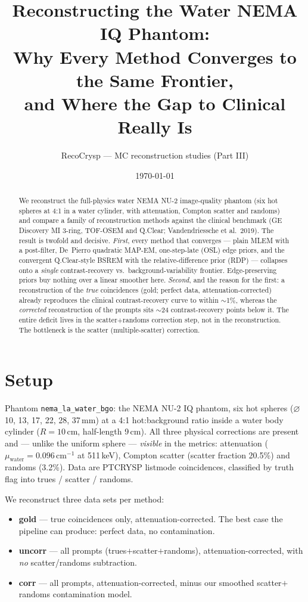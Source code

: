 \documentclass[11pt]{article}
\title{Reconstructing the Water NEMA IQ Phantom:\\
       Why Every Method Converges to the Same Frontier,\\
       and Where the Gap to Clinical Really Is}
\author{RecoCrysp --- MC reconstruction studies (Part III)}
\date{\today}
\newcommand{\code}[1]{\texttt{#1}}
\begin{document}
\maketitle

\begin{abstract}
We reconstruct the full-physics water NEMA NU-2 image-quality phantom (six hot
spheres at 4:1 in a water cylinder, with attenuation, Compton scatter and randoms)
and compare a family of reconstruction methods against the clinical benchmark
(GE Discovery MI 3-ring, TOF-OSEM and Q.Clear; Vandendriessche et al.\ 2019). The
result is twofold and decisive. \emph{First}, every method that converges --- plain
MLEM with a post-filter, De~Pierro quadratic MAP-EM, one-step-late (OSL) edge priors,
and the convergent Q.Clear-style BSREM with the relative-difference prior (RDP) ---
collapses onto a \emph{single} contrast-recovery vs.\ background-variability frontier.
Edge-preserving priors buy nothing over a linear smoother here. \emph{Second}, and the
reason for the first: a reconstruction of the \emph{true} coincidences (gold; perfect
data, attenuation-corrected) already reproduces the clinical contrast-recovery curve to
within $\sim$1\%, whereas the \emph{corrected} reconstruction of the prompts sits
$\sim$24 contrast-recovery points below it. The entire deficit lives in the
scatter$+$randoms correction step, not in the reconstruction. The bottleneck is the
scatter (multiple-scatter) correction.
\end{abstract}

\section{Setup}
Phantom \code{nema\_la\_water\_bgo}: the NEMA NU-2 IQ phantom, six hot spheres
($\varnothing$ 10, 13, 17, 22, 28, 37\,mm) at a 4:1 hot:background ratio inside a water
body cylinder ($R=10$\,cm, half-length 9\,cm). All three physical corrections are
present and --- unlike the uniform sphere --- \emph{visible} in the metrics:
attenuation ($\mu_{\text{water}}=0.096\,\text{cm}^{-1}$ at 511\,keV), Compton scatter
(scatter fraction 20.5\%) and randoms (3.2\%). Data are PTCRYSP listmode coincidences,
classified by truth flag into trues / scatter / randoms.

We reconstruct three data sets per method:
\begin{itemize}
  \item \textbf{gold} --- true coincidences only, attenuation-corrected. The best case
        the pipeline can produce: perfect data, no contamination.
  \item \textbf{uncorr} --- all prompts (trues$+$scatter$+$randoms),
        attenuation-corrected, with \emph{no} scatter/randoms subtraction.
  \item \textbf{corr} --- all prompts, attenuation-corrected, minus our smoothed
        scatter$+$randoms contamination model.
\end{itemize}
\end{document}

